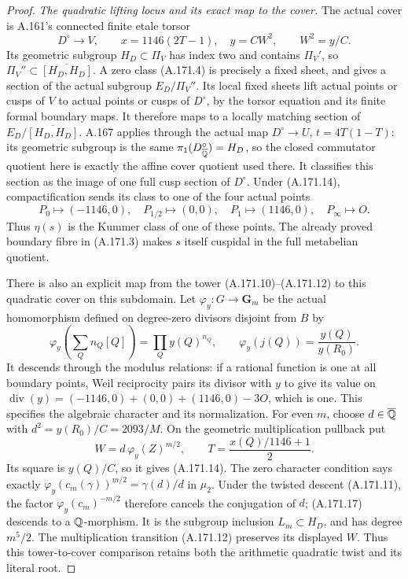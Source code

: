 \begin{proof}
\emph{The quadratic lifting locus and its exact map to the cover.}
The actual cover is A.161's connected finite etale torsor
\[
 D^\circ\longrightarrow V,
       \qquad x=1146(2T-1),\quad y=CW^2,
                   \qquad W^2=y/C.
\tag{A.171.14}
\]
Its geometric subgroup \(H_D\subset\Pi_V\) has index two and
contains \(\Pi_V'\), so
\(\Pi_V''\subset\overline{[H_D,H_D]}\).
A zero class (A.171.4) is precisely a fixed sheet, and gives a
section of the actual subgroup \(E_D/\Pi_V''\).
Its local fixed sheets lift actual points or cusps of \(V\) to
actual points or cusps of \(D^\circ\), by the torsor equation
and its finite formal boundary maps.  It therefore maps to a
locally matching section of
\(E_D/\overline{[H_D,H_D]}\).
A.167 applies through the actual map
\(D^\circ\to U\), \(t=4T(1-T)\): its geometric subgroup is
the same \(\pi_1(D^\circ_{\overline{\mathbb Q}})=H_D\), so the
closed commutator quotient here is exactly the affine cover
quotient used there.  It classifies this section as the image of
one full cusp section of \(D^\circ\).
Under (A.171.14), compactification
sends its class to one of the four actual points
\[
       P_0\mapsto(-1146,0),\quad P_{1/2}\mapsto(0,0),
             \quad P_1\mapsto(1146,0),\quad P_\infty\mapsto O.
\tag{A.171.15}
\]
Thus \(\eta(s)\) is the Kummer class of one of these points.
The already proved boundary fibre in (A.171.3) makes \(s\)
itself cuspidal in the full metabelian quotient.

There is also an explicit map from the tower (A.171.10)--(A.171.12)
to this quadratic cover on this subdomain.  Let
\(\varphi_y:G\to\mathbf G_m\) be the actual homomorphism
defined on degree-zero divisors disjoint from \(B\) by
\[
       \varphi_y\left(\sum_Qn_Q[Q]\right)=\prod_Q y(Q)^{n_Q},
           \qquad \varphi_y(j(Q))=\frac{y(Q)}{y(R_0)}.
\tag{A.171.16}
\]
It descends through the modulus relations: if a rational function
is one at all boundary points, Weil reciprocity pairs its divisor
with \(y\) to give its value on
\(\operatorname{div}(y)=(-1146,0)+(0,0)+(1146,0)-3O\),
which is one.  This specifies the algebraic character and its
normalization.  For even \(m\), choose
\(d\in\overline{\mathbb Q}\) with
\(d^2=y(R_0)/C=2093/M\).  On the geometric multiplication
pullback put
\[
                   W=d\,\varphi_y(Z)^{m/2},
                       \qquad T=\frac{x(Q)/1146+1}{2}.
\tag{A.171.17}
\]
Its square is \(y(Q)/C\), so it gives (A.171.14).
The zero character condition says exactly
\(\varphi_y(c_m(\gamma))^{m/2}=\gamma(d)/d\) in \(\mu_2\).
Under the twisted descent (A.171.11), the factor
\(\varphi_y(c_m)^{-m/2}\) therefore cancels the conjugation
of \(d\); (A.171.17) descends to a \(\mathbb Q\)-morphism.
It is the subgroup inclusion \(L_m\subset H_D\), and has
degree \(m^5/2\).  The multiplication transition (A.171.12)
preserves its displayed \(W\).  Thus this tower-to-cover comparison
retains both the arithmetic quadratic twist and its literal root.


\end{proof}
